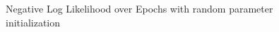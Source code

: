 \begin{figure}[H]
    \centering
    \caption{Negative Log Likelihood over Epochs with random parameter initialization}
\end{figure}

